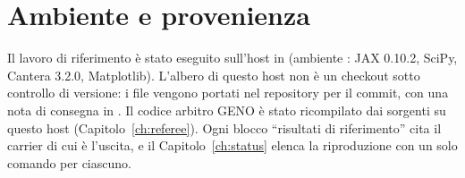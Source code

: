 \section{Ambiente e provenienza}

Il lavoro di riferimento è stato eseguito sull'host  in
 (ambiente :
JAX 0.10.2, SciPy, Cantera 3.2.0, Matplotlib). L'albero di questo
host non è un checkout sotto controllo di versione: i file vengono
portati nel repository per il commit, con una nota di consegna in
. Il codice arbitro GENO è stato ricompilato dai
sorgenti su questo host (Capitolo~\ref{ch:referee}). Ogni blocco
``risultati di riferimento'' cita il carrier di cui è l'uscita, e il
Capitolo~\ref{ch:status} elenca la riproduzione con un solo comando
per ciascuno.
